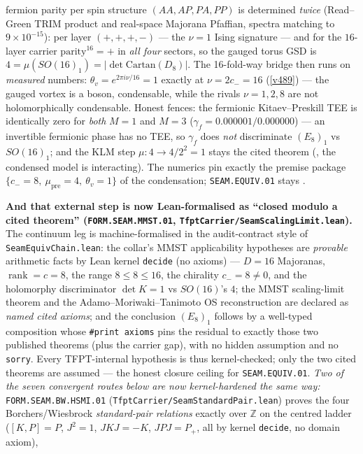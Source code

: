 \documentclass[11pt,a4paper]{article}
\begin{document}
\begin{keybox}
fermion parity per spin structure $(AA,AP,PA,PP)$ is determined \emph{twice} (Read--Green TRIM product and
real-space Majorana Pfaffian, spectra matching to $9{\times}10^{-15}$): per layer $(+,+,+,-)$ --- the
$\nu{=}1$ Ising signature --- and for the $16$-layer carrier $\mathrm{parity}^{16}={+}$ in \emph{all four}
sectors, so the gauged torus GSD is $4=\mu(SO(16)_1)=|\det\mathrm{Cartan}(D_8)|$. The 16-fold-way bridge
then runs on \emph{measured} numbers: $\theta_v=e^{2\pi i\nu/16}=1$ exactly at $\nu=2c_-=16$ (\vref{v489})
--- the gauged vortex is a boson, condensable, while the rivals $\nu=1,2,8$ are not holomorphically
condensable. Honest fences: the fermionic Kitaev--Preskill TEE is identically zero for \emph{both} $M{=}1$
and $M{=}3$ ($\gamma_f=0.000001/0.000000$) --- an invertible fermionic phase has no TEE, so $\gamma_f$ does
\emph{not} discriminate $(E_8)_1$ vs $SO(16)_1$; and the KLM step $\mu:4\to4/2^2=1$ stays the cited
theorem (\mC, the condensed model is interacting). The numerics pin exactly the premise package
$\{c_-{=}8,\ \mu_{\mathrm{pre}}{=}4,\ \theta_v{=}1\}$ of the condensation; \texttt{SEAM.EQUIV.01} stays \mO.
\par\smallskip\noindent\textbf{And that external step is now Lean-formalised as ``closed modulo a cited
theorem'' (\texttt{FORM.SEAM.MMST.01}, \texttt{TfptCarrier/SeamScalingLimit.lean}).} The continuum leg is
machine-formalised in the audit-contract style of \texttt{SeamEquivChain.lean}: the collar's MMST
applicability hypotheses are \emph{provable} arithmetic facts by Lean kernel \texttt{decide} (no axioms) ---
$D{=}16$ Majoranas, $\operatorname{rank}{=}c{=}8$, the range $8\le8\le16$, the chirality $c_-{=}8\neq0$, and
the holomorphy discriminator $\det K{=}1$ vs $SO(16)$'s $4$; the MMST scaling-limit theorem and the
Adamo--Moriwaki--Tanimoto OS reconstruction are declared as \emph{named cited axioms}; and the conclusion
$(E_8)_1$ follows by a well-typed composition whose \texttt{\#print axioms} pins the residual to exactly those
two published theorems (plus the carrier gap), with no hidden assumption and no \texttt{sorry}. Every
TFPT-internal hypothesis is thus kernel-checked; only the two cited theorems are assumed --- the honest
closure ceiling for \texttt{SEAM.EQUIV.01}. \emph{Two of the seven convergent routes below are now
kernel-hardened the same way:} \texttt{FORM.SEAM.BW.HSMI.01} (\texttt{TfptCarrier/SeamStandardPair.lean})
proves the four Borchers/Wiesbrock \emph{standard-pair relations} exactly over $\mathbb{Z}$ on the centred
ladder ($[K,P]{=}P$, $J^2{=}1$, $JKJ{=}{-}K$, $JPJ{=}P_+$, all by kernel \texttt{decide}, no domain axiom),

\end{keybox}
\end{document}
